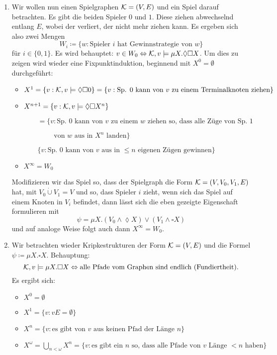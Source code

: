 \begin{example}
\begin{enumerate}
	\item Wir wollen nun einen Spielgraphen $\mathcal{K}=(V,E)$ und ein Spiel darauf betrachten. Es gibt die beiden Spieler $0$ und $1$. Diese ziehen abwechselnd entlang $E$, wobei der verliert, der nicht mehr ziehen kann. Es ergeben sich also zwei Mengen $$W_i\coloneqq \{w : \text{Spieler } i \text{ hat Gewinnstrategie von } w\}$$ für $i\in \{0,1\}$. Es wird behauptet: $v\in W_0 \Leftrightarrow \mathcal{K},v \models \mu X.\lozenge \square X$. Um dies zu zeigen wird wieder eine Fixpunktinduktion, beginnend mit $X^0=\emptyset$ durchgeführt:
	\begin{itemize}
		\item $X^1=\{v : \mathcal{K},v\models \lozenge\square 0\} = \{v : \text{Sp. } 0 \text{ kann von } v \text{ zu einem Terminalknoten ziehen}\}$
		\item $X^{n+1} = \{v : \mathcal{K},v\models \lozenge\square X^n\}$
		
		$\qquad = \{v : \text{Sp. } 0 \text{ kann von } v \text{ zu einem } w \text{ ziehen so, dass alle Züge von Sp. } 1$ 
		
		$\qquad\qquad \text{ von } w \text{ aus in } X^n \text{ landen}\}$
		
		$\qquad \{v : \text{Sp. } 0 \text{ kann von } v \text{ aus in } \leq n \text{ eigenen Zügen gewinnen}\}$
		\item $X^\infty = W_0$
	\end{itemize}
	
	Modifizieren wir das Spiel so, dass der Spielgraph die Form $\mathcal{K}=(V,V_0,V_1,E)$ hat, mit $V_0\dot{\cup}V_1=V$ und so, dass Spieler $i$ zieht, wenn sich das Spiel auf einem Knoten in $V_i$ \glqq befindet\grqq{}, dann lässt sich die eben gezeigte Eigenschaft formulieren mit $$\psi=\mu X . (V_0\land \lozenge X)\lor (V_1 \land \square X)$$ und auf analoge Weise folgt auch dann $X^\infty=W_0$.
	
	\item Wir betrachten wieder Kripkestrukturen der Form $\mathcal{K}=(V,E)$ und die Formel $\psi\coloneqq \mu X . \square X$. Behauptung: $$\mathcal{K},v\models \mu X.\square X \Leftrightarrow \text{alle Pfade vom Graphen sind endlich (Fundiertheit)}.$$ Es ergibt sich:
	\begin{itemize}
		\item $X^0 = \emptyset$
		\item $X^1 = \{v :vE =\emptyset\}$
		\item $X^n = \{v : \text{es gibt von } v \text{ aus keinen Pfad der Länge } n\}$
		\item $X^\omega = \bigcup_{n<\omega}X^n=\{v : \text{es gibt ein } n \text{ so, dass alle Pfade von } v \text{ Länge } <n \text{ haben}\}$
	\end{itemize}
	

\end{enumerate}
\end{example}
